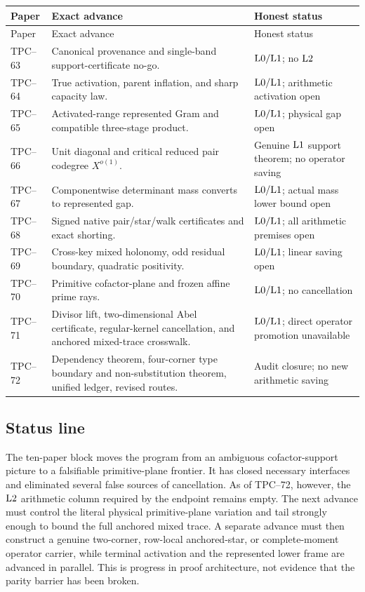 \begin{longtable}{>{\raggedright\arraybackslash}p{}
                  >{\raggedright\arraybackslash}p{}
                  >{\raggedright\arraybackslash}p{}}
\toprule
Paper & Exact advance & Honest status\\
\midrule
\endfirsthead
\toprule
Paper & Exact advance & Honest status\\
\midrule
\endhead
TPC--63
& Canonical provenance and single-band support-certificate no-go.
& \(\mathrm{L0}/\mathrm{L1}\); no \(\mathrm{L2}\)\\
\addlinespace
TPC--64
& True activation, parent inflation, and sharp capacity law.
& \(\mathrm{L0}/\mathrm{L1}\); arithmetic activation open\\
\addlinespace
TPC--65
& Activated-range represented Gram and compatible three-stage product.
& \(\mathrm{L0}/\mathrm{L1}\); physical gap open\\
\addlinespace
TPC--66
& Unit diagonal and critical reduced pair codegree \(X^{o(1)}\).
& Genuine \(\mathrm{L1}\) support theorem; no operator saving\\
\addlinespace
TPC--67
& Componentwise determinant mass converts to represented gap.
& \(\mathrm{L0}/\mathrm{L1}\); actual mass lower bound open\\
\addlinespace
TPC--68
& Signed native pair/star/walk certificates and exact shorting.
& \(\mathrm{L0}/\mathrm{L1}\); all arithmetic premises open\\
\addlinespace
TPC--69
& Cross-key mixed holonomy, odd residual boundary, quadratic positivity.
& \(\mathrm{L0}/\mathrm{L1}\); linear saving open\\
\addlinespace
TPC--70
& Primitive cofactor-plane and frozen affine prime rays.
& \(\mathrm{L0}/\mathrm{L1}\); no cancellation\\
\addlinespace
TPC--71
& Divisor lift, two-dimensional Abel certificate, regular-kernel
  cancellation, and anchored mixed-trace crosswalk.
& \(\mathrm{L0}/\mathrm{L1}\); direct operator promotion unavailable\\
\addlinespace
TPC--72
& Dependency theorem, four-corner type boundary and non-substitution
  theorem, unified ledger, revised routes.
& Audit closure; no new arithmetic saving\\
\bottomrule
\end{longtable}

\subsection{Status line}

The ten-paper block moves the program from an ambiguous cofactor-support
picture to a falsifiable primitive-plane frontier.  It has closed necessary
interfaces and eliminated several false sources of cancellation.  As of
TPC--72, however, the \(\mathrm{L2}\) arithmetic column required by the endpoint
remains empty.  The next advance must control the literal physical
primitive-plane variation and tail strongly enough to bound the full
anchored mixed trace.  A separate advance must then construct a genuine
two-corner, row-local anchored-star, or complete-moment operator carrier,
while terminal activation and the represented lower frame are advanced in
parallel.  This is progress in proof architecture, not evidence that the
parity barrier has been broken.
